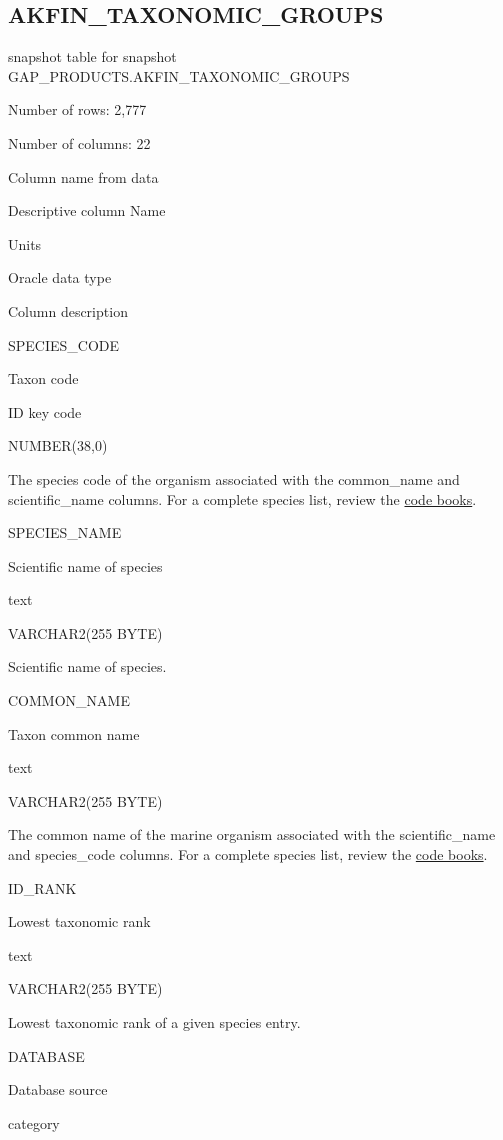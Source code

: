 \documentclass[
  letterpaper,
  oneside,
  open=any]{scrbook}
\begin{document}
\subsection{AKFIN\_TAXONOMIC\_GROUPS}\label{akfin_taxonomic_groups}

snapshot table for snapshot GAP\_PRODUCTS.AKFIN\_TAXONOMIC\_GROUPS

Number of rows: 2,777

Number of columns: 22

Column name from data

Descriptive column Name

Units

Oracle data type

Column description

SPECIES\_CODE

Taxon code

ID key code

NUMBER(38,0)

The species code of the organism associated with the common\_name and
scientific\_name columns. For a complete species list, review the
\href{https://www.fisheries.noaa.gov/resource/document/groundfish-survey-species-code-manual-and-data-codes-manual}{code
books}.

SPECIES\_NAME

Scientific name of species

text

VARCHAR2(255 BYTE)

Scientific name of species.

COMMON\_NAME

Taxon common name

text

VARCHAR2(255 BYTE)

The common name of the marine organism associated with the
scientific\_name and species\_code columns. For a complete species list,
review the
\href{https://www.fisheries.noaa.gov/resource/document/groundfish-survey-species-code-manual-and-data-codes-manual}{code
books}.

ID\_RANK

Lowest taxonomic rank

text

VARCHAR2(255 BYTE)

Lowest taxonomic rank of a given species entry.

DATABASE

Database source

category
\end{document}
